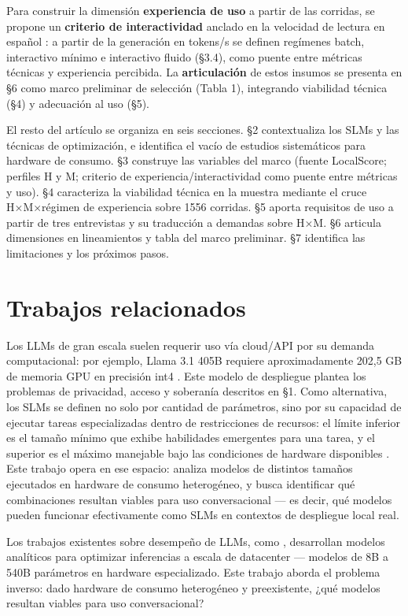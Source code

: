 \documentclass{llncs}
\begin{document}
Para construir la dimensión \textbf{experiencia de uso} a partir de las corridas, se propone un \textbf{criterio de interactividad} anclado en la velocidad de lectura en español \parencite{brysbaert2019}: a partir de la generación en tokens/s se definen regímenes batch, interactivo mínimo e interactivo fluido (§3.4), como puente entre métricas técnicas y experiencia percibida. La \textbf{articulación} de estos insumos se presenta en §6 como marco preliminar de selección (Tabla 1), integrando viabilidad técnica (§4) y adecuación al uso (§5).

El resto del artículo se organiza en seis secciones. §2 contextualiza los SLMs y las técnicas de optimización, e identifica el vacío de estudios sistemáticos para hardware de consumo. §3 construye las variables del marco (fuente LocalScore; perfiles H y M; criterio de experiencia/interactividad como puente entre métricas y uso). §4 caracteriza la viabilidad técnica en la muestra mediante el cruce H×M×régimen de experiencia sobre 1556 corridas. §5 aporta requisitos de uso a partir de tres entrevistas y su traducción a demandas sobre H×M. §6 articula dimensiones en lineamientos y tabla del marco preliminar. §7 identifica las limitaciones y los próximos pasos.

\section{Trabajos relacionados}\label{trabajos-relacionados}

Los LLMs de gran escala suelen requerir uso vía cloud/API por su demanda computacional: por ejemplo, Llama 3.1 405B requiere aproximadamente 202,5 GB de memoria GPU en precisión int4 \parencite{wang2025}. Este modelo de despliegue plantea los problemas de privacidad, acceso y soberanía descritos en §1. Como alternativa, los SLMs se definen no solo por cantidad de parámetros, sino por su capacidad de ejecutar tareas especializadas dentro de restricciones de recursos: el límite inferior es el tamaño mínimo que exhibe habilidades emergentes para una tarea, y el superior es el máximo manejable bajo las condiciones de hardware disponibles \parencite{wang2025}. Este trabajo opera en ese espacio: analiza modelos de distintos tamaños ejecutados en hardware de consumo heterogéneo, y busca identificar qué combinaciones resultan viables para uso conversacional — es decir, qué modelos pueden funcionar efectivamente como SLMs en contextos de despliegue local real.

Los trabajos existentes sobre desempeño de LLMs, como \textcite{pope2022}, desarrollan modelos analíticos para optimizar inferencias a escala de datacenter — modelos de 8B a 540B parámetros en hardware especializado. Este trabajo aborda el problema inverso: dado hardware de consumo heterogéneo y preexistente, ¿qué modelos resultan viables para uso conversacional?
\end{document}
